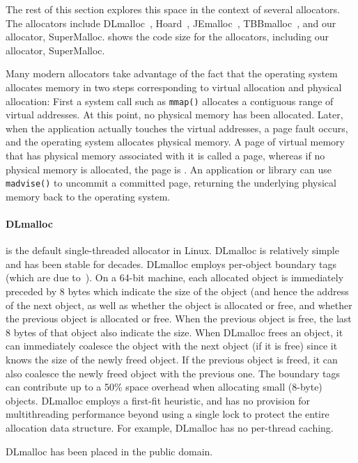 \documentclass[pldi]{sigplanconf-pldi15}
\def\code{\lstinline[basicstyle=\ttfamily]}
\begin{document}
The rest of this section explores this space in the context of several
allocators.  The allocators include DLmalloc~\cite{Lea96},
Hoard~\cite{BergerMcBl00}, JEmalloc~\cite{Evans06},
TBBmalloc~\cite{KukanovVo07}, and our allocator, SuperMalloc.
 shows the code size for the allocators, including
our allocator, SuperMalloc.

Many modern allocators take advantage of the fact that the operating
system allocates memory in two steps corresponding to virtual
allocation and physical allocation: First a system call such as
\code{mmap()} allocates a contiguous range of virtual addresses.  At
this point, no physical memory has been allocated.  Later, when the
application actually touches the virtual addresses, a page fault
occurs, and the operating system allocates physical memory.  A page of
virtual memory that has physical memory associated with it is called a
 page, whereas if no physical memory is allocated, the
page is .  An application or library can use
\code{madvise()} to uncommit a committed page, returning the
underlying physical memory back to the operating system.

{\paragraph{DLmalloc}} \cite{Lea96} is the default single-threaded
allocator in Linux.  DLmalloc is relatively simple and has been stable
for decades.  DLmalloc employs per-object boundary tags (which are due
to~\cite{Knuth73}).  On a 64-bit machine, each allocated object is
immediately preceded by 8 bytes which indicate the size of the object
(and hence the address of the next object, as well as whether the
object is allocated or free, and whether the previous object is
allocated or free.  When the previous object is free, the last 8 bytes
of that object also indicate the size.  When DLmalloc frees an object,
it can immediately coalesce the object with the next object (if it is
free) since it knows the size of the newly freed object.  If the
previous object is freed, it can also coalesce the newly freed object
with the previous one.  The boundary tags can contribute up to a 50\%
space overhead when allocating small (8-byte) objects.  DLmalloc
employs a first-fit heuristic, and has no provision for multithreading
performance beyond using a single lock to protect the entire
allocation data structure.  For example, DLmalloc has no per-thread
caching.

DLmalloc has been placed in the public domain.
\end{document}
